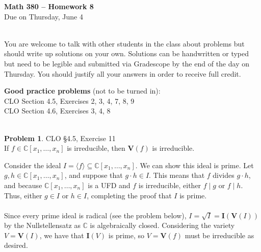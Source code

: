 \documentclass[12pt]{amsart}
\theoremstyle{definition}
\newtheorem{prob}{Problem}
\begin{document}
 \thispagestyle{empty}
\begin{center} {\large \textbf{Math 380 -- Homework 8}} \smallskip \\ 
Due on Thursday, June 4 \\ \ \\
 \end{center}

You are welcome to talk with other students in the class about problems but should write up solutions on your own. 
Solutions can be handwritten or typed but need to be legible and submitted via Gradescope by the end of the day 
on Thursday. You should justify all your answers in order to receive full credit.  
\bigskip 

\begin{flushleft}

{\bf Good practice problems} (not to be turned in): \\

CLO Section 4.5, Exercises 2, 3, 4, 7, 8, 9 \\
CLO Section 4.6, Exercises 3, 4, 8\\
\ \ \\
\bigskip 




\begin{prob} CLO \S4.5, Exercise 11  \smallskip  \\
If $f \in \mathbb C[x_1,\dots,x_n]$ is irreducible, then $\mathbf V(f)$ is irreducible.
\end{prob}

Consider the ideal $I = \langle f \rangle \subseteq \mathbb C [x_1,\dots,x_n]$. We can show this ideal is prime. Let $g,h \in \mathbb C[x_1,\dots,x_n]$, and suppose that $g \cdot h \in I$. This means that $f$ divides $g \cdot h$, and because $\mathbb C[x_1,\dots,x_n]$ is a UFD and $f$ is irreducible, either $f \mid g$ or $f \mid h$. Thus, either $g \in I$ or $h \in I$, completing the proof that $I$ is prime.
\\ \ \\
Since every prime ideal is radical (see the problem below), $I = \sqrt{I} = \mathbf I(\mathbf V(I))$ by the Nullstellensatz as $\mathbb C$ is algebraically closed. Considering the variety $V = \mathbf V(I)$, we have that $\mathbf I(V)$ is prime, so $V=\mathbf V(f)$ must be irreducible as desired.

\bigskip 


\end{flushleft}
\end{document}
